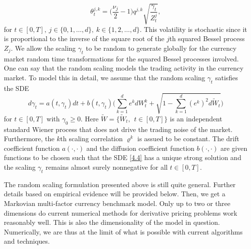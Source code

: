 \documentclass[a4 paper, 12pt]{report}
\theoremstyle{plain}
\begin{document}
\begin{equation}\label{4.3}
\theta_t^{j,k} = \bigg(\frac{\nu_j}{2} - 1\bigg)q^{j,k}\sqrt{\frac{\gamma_t}{Z_t^j}},
\end{equation}
for $t\in [0,T],~ j\in\{0,1,\ldots,d\},~k\in\{1,2,\ldots,d\}$. This volatility is stochastic since it is proportional to the inverse of the square root of the $j$th squared Bessel process $Z_j$. We allow the scaling $\gamma_t$ to be random to generate globally for the currency market random time transformations for the squared Bessel processes involved. One can say that the random scaling models the trading activity in the currency market. To model this in detail, we assume that the random scaling $\gamma_t$ satisfies the SDE
\begin{equation}\label{4.4}
d\gamma_t = a(t,\gamma_t)dt+b(t,\gamma_t)\bigg(\sum_{k = 1}^de^k dW_t^k+\sqrt{1-\sum_{k = 1}^d(e^k)^2d\tilde{W}_t}\bigg)
\end{equation}
for $t\in[0,T]$ with $\gamma_0\geq 0.$ Here $\tilde{W} = \{\tilde{W}_t,~~t\in [0,T]\}$ is an independent standard Wiener process that does not drive the trading noise of the market. Furthermore, the $k$th scaling correlation $\varrho^k$ is assued to be constant. The drift coefficient function $a(\cdot,\cdot)$ and the diffusion coefficient function $b(\cdot,\cdot)$ are given functions to be chosen such that the SDE \eqref{4.4} has a unique strong solution and the scaling $\gamma_t$ remains almost surely nonnegative for all $t\in[0,T]$.\\

\par The random scaling formulation presented above is still quite general. Further details based on empirical evidence will be provided below. Then, we get a Markovian multi-factor currency benchmark model. Only up to two or three dimensions do current numerical methods for derivative pricing problems work reasonably well. This is also the dimensionality of the model in question. Numerically, we are thus at the limit of what is possible with current algorithms and techniques.\\ %
\end{document}
